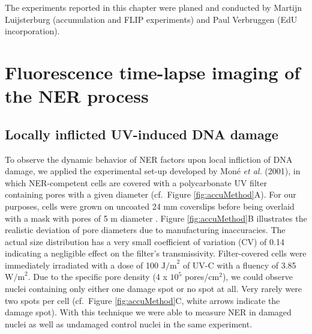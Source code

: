 The experiments reported in this chapter were planed and conducted by Martijn Luijsterburg (accumulation and FLIP experiments) and Paul Verbruggen (EdU incorporation).
	
	
\section{Fluorescence time-lapse imaging of the NER process}

\subsection{Locally inflicted UV-induced DNA damage}
\label{sec:local_irradiation}
 

To observe the dynamic behavior of NER factors upon local infliction of DNA damage, we applied the experimental set-up developed by Mon\'e \textit{et al.} (2001)\cite{Mone2001}, in which NER-competent cells are covered with a polycarbonate UV filter containing pores with a given diameter (cf.\ Figure \ref{fig:accuMethod}A). For our purposes, cells were grown on uncoated 24 mm coverslips before being overlaid with a mask with pores of 5 \textmu m diameter \cite{Verbruggen2014}. Figure \ref{fig:accuMethod}B illustrates the realistic deviation of pore diameters due to manufacturing inaccuracies. The actual size distribution has a very small coefficient of variation (CV) of 0.14 indicating a negligible effect on the filter's transmissivity. Filter-covered cells were immediately irradiated with a dose of 100 $\text{J/m}^\text{2}$ of UV-C with a fluency of 3.85 $\text{W/m}^\text{2}$. Due to the specific pore density (4 x $\text{10}^\text{5}$ pores/$\text{cm}^\text{2}$), we could observe nuclei containing only either one damage spot or no spot at all. Very rarely were two spots per cell (cf.\ Figure \ref{fig:accuMethod}C, white arrows indicate the damage spot). With this technique we were able to measure NER in damaged nuclei as well as undamaged control nuclei in the same experiment.

